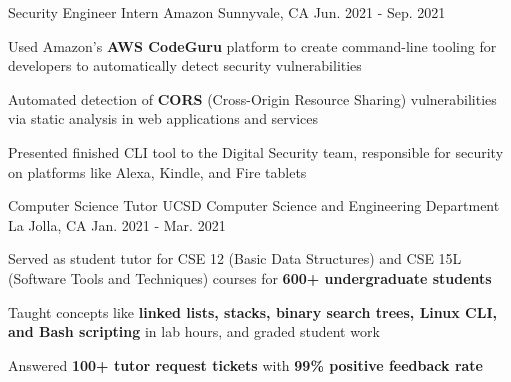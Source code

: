 

\begin{cventries}

\cventry
  {Security Engineer Intern} %
  {Amazon} %
  {Sunnyvale, CA} %
  {Jun. 2021 - Sep. 2021} %
  {
    \begin{cvitems} %
      \item {Used Amazon's \textbf{AWS CodeGuru} platform to create command-line tooling for developers to automatically detect security vulnerabilities}
      \item {Automated detection of \textbf{CORS} (Cross-Origin Resource Sharing) vulnerabilities via static analysis in web applications and services}
      \item {Presented finished CLI tool to the Digital Security team, responsible for security on platforms like Alexa, Kindle, and Fire tablets}
    \end{cvitems}
  }

  \cventry
    {Computer Science Tutor} %
    {UCSD Computer Science and Engineering Department} %
    {La Jolla, CA} %
    {Jan. 2021 - Mar. 2021} %
    {
      \begin{cvitems} %
        \item {Served as student tutor for CSE 12 (Basic Data Structures) and CSE 15L (Software Tools and Techniques) courses for \textbf{600+ undergraduate students}}
        \item {Taught concepts like \textbf{linked lists, stacks, binary search trees, Linux CLI, and Bash scripting} in lab hours, and graded student work}
        \item {Answered \textbf{100+ tutor request tickets} with \textbf{99\% positive feedback rate}}
      \end{cvitems}
    }



\end{cventries}
